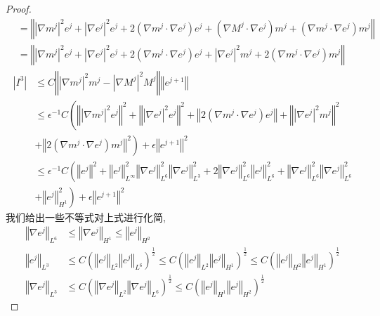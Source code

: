 \documentclass[UTF8,a4paper]{article}
\begin{document}
\begin{proof}
{\begin{align*}
  &=\left\Vert \left| \nabla m^j \right|^2\!e^j+\left|\nabla e^j \right| ^2\!e^j+2(\nabla m^j\cdot\nabla e^j)e^j+(\nabla M^j\cdot\nabla e^j)m^j+(\nabla m^j\cdot\nabla e^j)m^j\right\Vert\\
  &=\left\Vert \left| \nabla m^j \right|^2\!e^j+\left|\nabla e^j \right| ^2\!e^j+2(\nabla m^j\cdot\nabla e^j)e^j+\left| \nabla e^j \right|^2m^j+2(\nabla m^j\cdot\nabla e^j)m^j\right\Vert
\end{align*}
}
{\small
\begin{align*}
  \left| I^3 \right|&\leq C \left\Vert\left| \nabla m^j \right|^2m^j-\left| \nabla M^j \right|^2M^j \right\Vert \left\Vert e^{j+1}\right\Vert\\
                    &\leq\epsilon^{-1}C \left(\left\Vert \left| \nabla m^j \right|^2\!e^j\right\Vert^{2}+\left\Vert\left|\nabla e^j \right| ^2\!e^j\right\Vert^2+\left\Vert2(\nabla m^j\cdot\nabla e^j)e^j\right\Vert+\left\Vert\left| \nabla e^j \right|^2m^j\right\Vert^2\right.\\
                    &\left.+\left\Vert2(\nabla m^j\cdot\nabla e^j)m^j\right\Vert^2 \right)+\epsilon \left\Vert e^{j+1}\right\Vert^2\\
                    &\leq \epsilon^{-1}C \left( \left\Vert e^j\right\Vert^2+\left\Vert e^j\right\Vert_{L^{\infty}}^2 \left\Vert \nabla e^j\right\Vert_{L^6}^2 \left\Vert \nabla e^j\right\Vert _{L^3}^2+2 \left\Vert \nabla e^j\right\Vert _{L^6}^2 \left\Vert e^j\right\Vert _{L^6}^2+\left\Vert \nabla e^j\right\Vert _{L^6}^2 \left\Vert\nabla e^j\right\Vert _{L^6}^2\right.\\
                    &\left.+\left\Vert e^j\right\Vert_{H^1}^2\right)+\epsilon \left\Vert e^{j+1}\right\Vert^2
 \end{align*}
}
我们给出一些不等式对上式进行化简,
\begin{align*}
    \left\Vert \nabla e^j\right\Vert_{L^6}&\leq \left\Vert\nabla e^j\right\Vert_{H^1}\leq \left\Vert e^j\right\Vert_{H^2}\\
  \left\Vert e^j\right\Vert_{L^3}&\leq C \left( \left\Vert e^j\right\Vert_{L^2} \left\Vert e^j\right\Vert _{L^6}\right)^{\frac{1}{2}}
                           \leq C \left( \left\Vert e^j\right\Vert_{L^2} \left\Vert e^j\right\Vert _{H^1}\right)^{\frac{1}{2}}\leq C \left( \left\Vert e^j\right\Vert_{H^2} \left\Vert e^j\right\Vert _{H^1}\right)^{\frac{1}{2}}\\
 \left\Vert\nabla e^j\right\Vert_{L^3}&\leq C \left( \left\Vert\nabla e^j\right\Vert_{L^2} \left\Vert\nabla e^j\right\Vert _{L^6}\right)^{\frac{1}{2}}
                          \leq C \left( \left\Vert e^j\right\Vert_{H^1} \left\Vert e^j\right\Vert _{H^2}\right)^{\frac{1}{2}}

\end{align*}
\end{proof}
\end{document}
